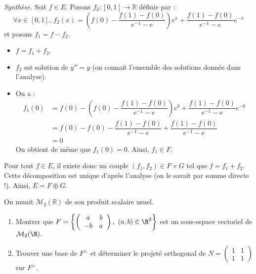 \documentclass[a4paper,10pt]{report}
\begin{document}
 \noindent \textit{Synthèse.} Soit $f \in E$. Posons $f_2 : [0,1] \rightarrow \mathbb{R}$ définie par :
 $$ \forall x \in [0,1], \, f_2(x)= \left(f(0) - \dfrac{f(1)-f(0)}{e^{-1}-e} \right) e^x + \dfrac{f(1)-f(0)}{e^{-1}-e} e^{-x}$$
 et posons $f_1 = f-f_2$. 
 \begin{itemize}
 \item $f=f_1+f_2$.
 \item $f_2$ est solution de $y''=y$ (on connait l'ensemble des solutions donnée dans l'analyse).
 \item On a :
 \begin{align*}
 f_1(0) & = f(0) - \left(f(0) - \dfrac{f(1)-f(0)}{e^{-1}-e} \right) e^0 + \dfrac{f(1)-f(0)}{e^{-1}-e} e^{-0} \\
 & = f(0) -f(0) - \dfrac{f(1)-f(0)}{e^{-1}-e} + \dfrac{f(1)-f(0)}{e^{-1}-e} \\
 & = 0 
 \end{align*}
 On obtient de même que $f_1(0)=0$. Ainsi, $f_1 \in F$.
 \end{itemize}
 Pour tout $f \in E$, il existe donc un couple $(f_1,f_2) \in F \times G$ tel que $f=f_1+f_2$. Cette décomposition est unique d'après l'analyse (on le savait par somme directe !). Ainsi, $E= F \oplus G$.
 
 
 
 \begin{Exa} On munit $\mathcal{M}_2(\mathbb{R})$ de son produit scalaire usuel.
\begin{enumerate}
\item Montrer que $F=\left\{\left(\begin{array}{cc} a & b\\ -b & a \end{array}\right),\ (a,b)\in\R^2\right
\}$ est un sous-espace vectoriel de ${\cal M}_2(\R).$
\item Trouver une base de $F^{\perp}$ et d\'eterminer le projet\'e orthogonal de $N=\left(\begin{array}{cc} 1&1\\ 1&1 \end{array}\right)$ sur $F^{\perp}$.
\end{enumerate}
\end{Exa}

\corr 
\end{document}
